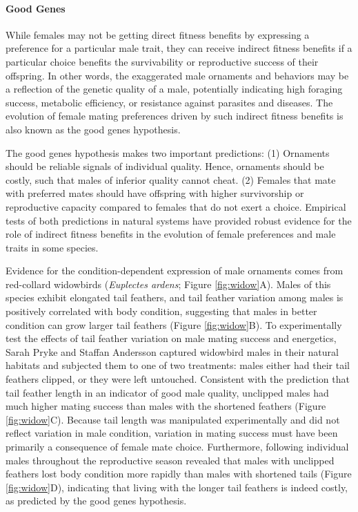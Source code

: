 \documentclass[
]{book}
\begin{document}
\hypertarget{good-genes}{%
\paragraph*{Good Genes}\label{good-genes}}

While females may not be getting direct fitness benefits by expressing a preference for a particular male trait, they can receive indirect fitness benefits if a particular choice benefits the survivability or reproductive success of their offspring. In other words, the exaggerated male ornaments and behaviors may be a reflection of the genetic quality of a male, potentially indicating high foraging success, metabolic efficiency, or resistance against parasites and diseases. The evolution of female mating preferences driven by such indirect fitness benefits is also known as the good genes hypothesis.

The good genes hypothesis makes two important predictions: (1) Ornaments should be reliable signals of individual quality. Hence, ornaments should be costly, such that males of inferior quality cannot cheat. (2) Females that mate with preferred mates should have offspring with higher survivorship or reproductive capacity compared to females that do not exert a choice. Empirical tests of both predictions in natural systems have provided robust evidence for the role of indirect fitness benefits in the evolution of female preferences and male traits in some species.

Evidence for the condition-dependent expression of male ornaments comes from red-collard widowbirds (\emph{Euplectes ardens}; Figure \ref{fig:widow}A). Males of this species exhibit elongated tail feathers, and tail feather variation among males is positively correlated with body condition, suggesting that males in better condition can grow larger tail feathers (Figure \ref{fig:widow}B). To experimentally test the effects of tail feather variation on male mating success and energetics, Sarah Pryke and Staffan Andersson captured widowbird males in their natural habitats and subjected them to one of two treatments: males either had their tail feathers clipped, or they were left untouched. Consistent with the prediction that tail feather length in an indicator of good male quality, unclipped males had much higher mating success than males with the shortened feathers (Figure \ref{fig:widow}C). Because tail length was manipulated experimentally and did not reflect variation in male condition, variation in mating success must have been primarily a consequence of female mate choice. Furthermore, following individual males throughout the reproductive season revealed that males with unclipped feathers lost body condition more rapidly than males with shortened tails (Figure \ref{fig:widow}D), indicating that living with the longer tail feathers is indeed costly, as predicted by the good genes hypothesis.
\end{document}
